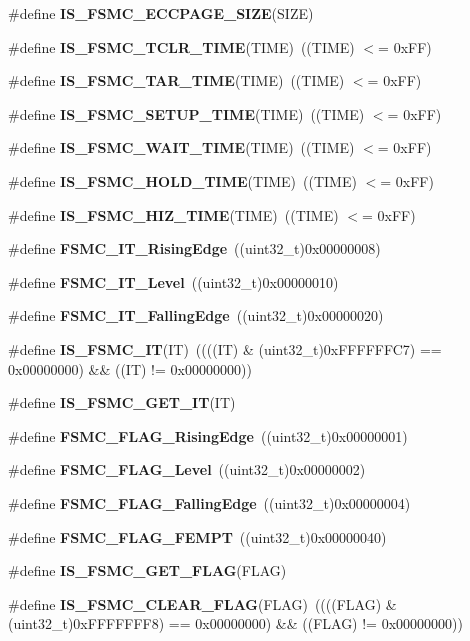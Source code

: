 \begin{DoxyCompactItemize}
\item 
\#define \textbf{ I\+S\+\_\+\+F\+S\+M\+C\+\_\+\+E\+C\+C\+P\+A\+G\+E\+\_\+\+S\+I\+ZE}(S\+I\+ZE)
\item 
\#define \textbf{ I\+S\+\_\+\+F\+S\+M\+C\+\_\+\+T\+C\+L\+R\+\_\+\+T\+I\+ME}(T\+I\+ME)~((T\+I\+ME) $<$= 0x\+F\+F)
\item 
\#define \textbf{ I\+S\+\_\+\+F\+S\+M\+C\+\_\+\+T\+A\+R\+\_\+\+T\+I\+ME}(T\+I\+ME)~((T\+I\+ME) $<$= 0x\+F\+F)
\item 
\#define \textbf{ I\+S\+\_\+\+F\+S\+M\+C\+\_\+\+S\+E\+T\+U\+P\+\_\+\+T\+I\+ME}(T\+I\+ME)~((T\+I\+ME) $<$= 0x\+F\+F)
\item 
\#define \textbf{ I\+S\+\_\+\+F\+S\+M\+C\+\_\+\+W\+A\+I\+T\+\_\+\+T\+I\+ME}(T\+I\+ME)~((T\+I\+ME) $<$= 0x\+F\+F)
\item 
\#define \textbf{ I\+S\+\_\+\+F\+S\+M\+C\+\_\+\+H\+O\+L\+D\+\_\+\+T\+I\+ME}(T\+I\+ME)~((T\+I\+ME) $<$= 0x\+F\+F)
\item 
\#define \textbf{ I\+S\+\_\+\+F\+S\+M\+C\+\_\+\+H\+I\+Z\+\_\+\+T\+I\+ME}(T\+I\+ME)~((T\+I\+ME) $<$= 0x\+F\+F)
\item 
\#define \textbf{ F\+S\+M\+C\+\_\+\+I\+T\+\_\+\+Rising\+Edge}~((uint32\+\_\+t)0x00000008)
\item 
\#define \textbf{ F\+S\+M\+C\+\_\+\+I\+T\+\_\+\+Level}~((uint32\+\_\+t)0x00000010)
\item 
\#define \textbf{ F\+S\+M\+C\+\_\+\+I\+T\+\_\+\+Falling\+Edge}~((uint32\+\_\+t)0x00000020)
\item 
\#define \textbf{ I\+S\+\_\+\+F\+S\+M\+C\+\_\+\+IT}(IT)~((((IT) \& (uint32\+\_\+t)0x\+F\+F\+F\+F\+F\+F\+C7) == 0x00000000) \&\& ((\+I\+T) != 0x00000000))
\item 
\#define \textbf{ I\+S\+\_\+\+F\+S\+M\+C\+\_\+\+G\+E\+T\+\_\+\+IT}(IT)
\item 
\#define \textbf{ F\+S\+M\+C\+\_\+\+F\+L\+A\+G\+\_\+\+Rising\+Edge}~((uint32\+\_\+t)0x00000001)
\item 
\#define \textbf{ F\+S\+M\+C\+\_\+\+F\+L\+A\+G\+\_\+\+Level}~((uint32\+\_\+t)0x00000002)
\item 
\#define \textbf{ F\+S\+M\+C\+\_\+\+F\+L\+A\+G\+\_\+\+Falling\+Edge}~((uint32\+\_\+t)0x00000004)
\item 
\#define \textbf{ F\+S\+M\+C\+\_\+\+F\+L\+A\+G\+\_\+\+F\+E\+M\+PT}~((uint32\+\_\+t)0x00000040)
\item 
\#define \textbf{ I\+S\+\_\+\+F\+S\+M\+C\+\_\+\+G\+E\+T\+\_\+\+F\+L\+AG}(F\+L\+AG)
\item 
\#define \textbf{ I\+S\+\_\+\+F\+S\+M\+C\+\_\+\+C\+L\+E\+A\+R\+\_\+\+F\+L\+AG}(F\+L\+AG)~((((F\+L\+AG) \& (uint32\+\_\+t)0x\+F\+F\+F\+F\+F\+F\+F8) == 0x00000000) \&\& ((\+F\+L\+A\+G) != 0x00000000))
\end{DoxyCompactItemize}
